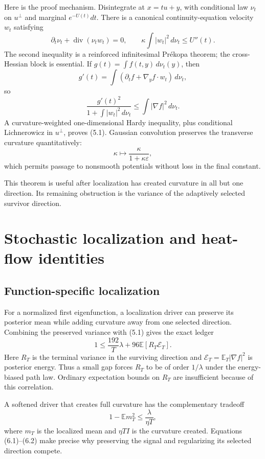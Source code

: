 \documentclass[11pt]{article}
\theoremstyle{definition}
\theoremstyle{remark}
\newcommand{\E}{\mathbb E}
\newcommand{\1}{\mathbf 1}
\newcommand{\dd}{\,d}
\begin{document}
Here is the proof mechanism.  Disintegrate at
\(x=tu+y\), with conditional law \(\nu_t\) on \(u^\perp\) and marginal
\(e^{-U(t)}dt\).  There is a canonical continuity-equation velocity
\(w_t\) satisfying
\[
 \partial_t\nu_t+\operatorname{div}(\nu_tw_t)=0,
 \qquad
 \kappa\int|w_t|^2\dd\nu_t\le U''(t).                \tag{5.2}
\]
The second inequality is a reinforced infinitesimal Pr\'ekopa theorem;
the cross-Hessian block is essential.  If
\(g(t)=\int f(t,y)\dd\nu_t(y)\), then
\[
 g'(t)=\int(\partial_tf+\nabla_yf\cdot w_t)\dd\nu_t,
\]
so
\[
 \frac{g'(t)^2}{1+\int|w_t|^2\dd\nu_t}
 \le\int|\nabla f|^2\dd\nu_t.                        \tag{5.3}
\]
A curvature-weighted one-dimensional Hardy inequality, plus conditional
Lichnerowicz in \(u^\perp\), proves (5.1).  Gaussian convolution preserves
the transverse curvature quantitatively:
\[
 \kappa\longmapsto\frac{\kappa}{1+\kappa\varepsilon},
\]
which permits passage to nonsmooth potentials without loss in the final
constant.

This theorem is useful after localization has created curvature in all but
one direction.  Its remaining obstruction is the variance of the
adaptively selected survivor direction.

\section{Stochastic localization and heat-flow identities}

\subsection{Function-specific localization}

For a normalized first eigenfunction, a localization driver can preserve
its posterior mean while adding curvature away from one selected direction.
Combining the preserved variance with (5.1) gives the exact ledger
\[
 \boxed{\quad
 1\le\frac{192}{T}\lambda
 +96\E[R_T\mathcal E_T].
 \quad}                                               \tag{6.1}
\]
Here \(R_T\) is the terminal variance in the surviving direction and
\(\mathcal E_T=\E_T|\nabla f|^2\) is posterior energy.  Thus a small gap
forces \(R_T\) to be of order \(1/\lambda\) under the
energy-biased path law.  Ordinary expectation bounds on \(R_T\) are
insufficient because of this correlation.

A softened driver that creates full curvature has the complementary
tradeoff
\[
                         1-\E m_T^2\le\frac{\lambda}{\eta T}, \tag{6.2}
\]
where \(m_T\) is the localized mean and \(\eta T I\) is the curvature
created.  Equations (6.1)--(6.2) make precise why preserving the signal and
regularizing its selected direction compete.
\end{document}
